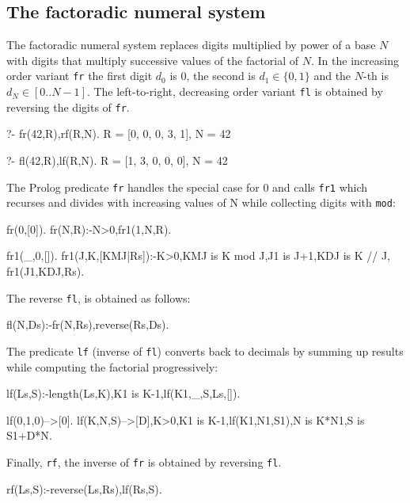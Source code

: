 \documentclass[]{INCLUDES/llncs}
\begin{document}
\subsection{The factoradic numeral system}
The factoradic numeral system \cite{knuth_art_1997-1} replaces digits
multiplied by power of a base $N$ with digits that multiply successive values
of the factorial of $N$. In the increasing order variant {\tt fr} the first
digit $d_0$ is 0, the second is $d_1 \in \{0,1\}$ and the $N$-th is $d_N \in
[0..N-1]$. The left-to-right, decreasing order variant {\tt fl} 
is obtained by reversing the digits of {\tt fr}.
\begin{codex}
?- fr(42,R),rf(R,N).
R = [0, 0, 0, 3, 1],
N = 42

?- fl(42,R),lf(R,N).
R = [1, 3, 0, 0, 0],
N = 42
\end{codex}
\noindent The Prolog predicate {\tt fr} handles the special case for $0$ and
calls {\tt fr1} which recurses and divides with increasing values of N
while collecting digits with {\tt mod}:
\begin{code}
fr(0,[0]).
fr(N,R):-N>0,fr1(1,N,R).
   
fr1(_,0,[]).
fr1(J,K,[KMJ|Rs]):-K>0,KMJ is K mod J,J1 is J+1,KDJ is K // J,
  fr1(J1,KDJ,Rs).
\end{code}
The reverse {\tt fl}, is obtained as follows:
\begin{code}
fl(N,Ds):-fr(N,Rs),reverse(Rs,Ds).
\end{code}
The predicate {\tt lf} (inverse of {\tt fl}) converts back to decimals by
summing up results while computing the factorial progressively:
\begin{code}
lf(Ls,S):-length(Ls,K),K1 is K-1,lf(K1,_,S,Ls,[]).

lf(0,1,0)-->[0].
lf(K,N,S)-->[D],{K>0,K1 is K-1},lf(K1,N1,S1),{N is K*N1,S is S1+D*N}.
\end{code}
Finally, {\tt rf}, the inverse of {\tt fr} is obtained by reversing {\tt fl}.
\begin{code}
rf(Ls,S):-reverse(Ls,Rs),lf(Rs,S).
\end{code}
\end{document}

